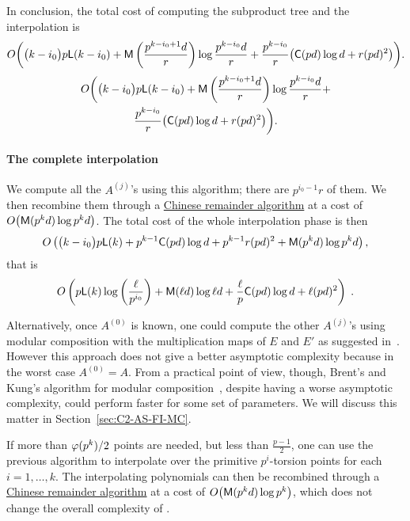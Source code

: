 In conclusion, the total cost of computing the subproduct tree and the
interpolation is
\ifafourps
\begin{equation*}
  O\biggl(\bigl(k-i_0\bigr)p\mathsf{L}(k-i_0) + \mathsf{M}\left(\frac{p^{k-i_0+1}d}{r}\right)\log \frac{p^{k-i_0}d}{r} +
  \frac{p^{k-i_0}}{r}\bigl(\mathsf{C}(pd)\log d + r(pd)^2\bigr)\biggr)
  \text{.}
\end{equation*}
\else
\begin{multline*}
  O\biggl(\bigl(k-i_0\bigr)p\mathsf{L}(k-i_0) + \mathsf{M}\left(\frac{p^{k-i_0+1}d}{r}\right)\log \frac{p^{k-i_0}d}{r} +\\
  \frac{p^{k-i_0}}{r}\bigl(\mathsf{C}(pd)\log d + r(pd)^2\bigr)\biggr)
  \text{.}
\end{multline*}
\fi

\paragraph{The complete interpolation}
We compute all the $A^{(j)}$'s using this algorithm; there are
$p^{i_0-1}r$ of them. We then recombine them through a
\hyperref[sec:chin-rema-algor]{Chinese remainder algorithm} at a cost
of $O\bigl(\mathsf{M}(p^kd)\log p^kd\bigr)$. The total cost of the whole
interpolation phase is then
\begin{equation*}
  O\left(\bigl(k-i_0\bigr) p\mathsf{L}(k) + p^{k-1}\mathsf{C}(pd)\log d +
    p^{k-1}r(pd)^2 + \mathsf{M}(p^kd)\log p^kd \right)\text{,}
\end{equation*}
that is
\begin{equation}
  \label{eq:interp}
  O\left(p\mathsf{L}(k)\log\left(\frac{\ell}{p^{i_0}}\right) + 
    \mathsf{M}(\ell d)\log\ell d +
    \frac{\ell}{p}\mathsf{C}(pd)\log d +
    \ell (pd)^2
  \right)
  \;\text{.}
\end{equation}

Alternatively, once $A^{(0)}$ is known, one could compute the other
$A^{(j)}$'s using modular composition with the multiplication maps of
$E$ and $E'$ as suggested in~\cite{couveignes96}. However this
approach does not give a better asymptotic complexity because in the
worst case $A^{(0)}=A$. From a practical point of view, though,
Brent's and Kung's algorithm for modular
composition~\cite{brent+kung}, despite having a worse asymptotic
complexity, could perform faster for some set of parameters. We will
discuss this matter in Section~\ref{sec:C2-AS-FI-MC}.

If more than $\varphi(p^k)/2$ points are needed, but less than
$\frac{p-1}{2}$, one can use the previous algorithm to interpolate
over the primitive $p^i$-torsion points for each $i=1,\ldots,k$. The
interpolating polynomials can then be recombined through a
\hyperref[sec:chin-rema-algor]{Chinese remainder algorithm} at a cost
of $O\bigl(\mathsf{M}(p^kd)\log p^k\bigr)$, which does not change the
overall complexity of \ctwoasfi{}.


